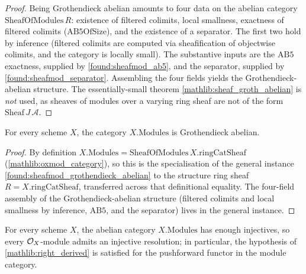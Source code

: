 \begin{proof}
  \leanok
  Being Grothendieck abelian amounts to four data on the abelian category
  \(\mathrm{SheafOfModules}\,R\): existence of filtered colimits, local smallness,
  exactness of filtered colimits (\(\mathrm{AB5OfSize}\)), and the existence of a
  separator.  The first two hold by inference (filtered colimits are computed via
  sheafification of objectwise colimits, and the category is locally small).  The
  substantive inputs are the \(\mathrm{AB5}\) exactness, supplied by
  \cref{found:sheafmod_ab5}, and the separator, supplied by
  \cref{found:sheafmod_separator}.  Assembling the four fields yields the
  Grothendieck-abelian structure.  The essentially-small theorem
  \cref{mathlib:sheaf_groth_abelian} is \emph{not} used, as sheaves of modules over
  a varying ring sheaf are not of the form \(\mathrm{Sheaf}\,J\,\mathcal A\).
\end{proof}

\begin{lemma}
  \label{found:modules_grothendieck_abelian}
  For every scheme \(X\), the category \(X.\mathrm{Modules}\) is Grothendieck
  abelian.
\end{lemma}

\begin{proof}
  \leanok
  By definition \(X.\mathrm{Modules}=\mathrm{SheafOfModules}\,X.\mathrm{ringCatSheaf}\)
  (\cref{mathlib:oxmod_category}), so this is the specialisation of the general
  instance \cref{found:sheafmod_grothendieck_abelian} to the structure ring sheaf
  \(R=X.\mathrm{ringCatSheaf}\), transferred across that definitional equality.  The
  four-field assembly of the Grothendieck-abelian structure (filtered colimits and
  local smallness by inference, \(\mathrm{AB5}\), and the separator) lives in the
  general instance.
\end{proof}

\begin{lemma}
  \label{found:has_injective_resolutions}
  For every scheme \(X\), the abelian category \(X.\mathrm{Modules}\) has enough
  injectives, so every \(\mathcal{O}_X\)-module admits an injective resolution; in
  particular, the hypothesis of \cref{mathlib:right_derived} is satisfied for
  the pushforward functor in the module category.
\end{lemma}

